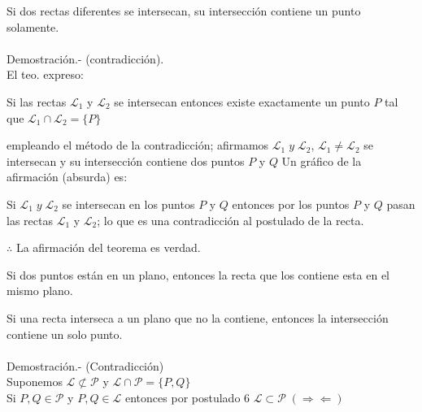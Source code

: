 \begin{teo}
Si dos rectas diferentes se intersecan, su intersección contiene un punto solamente.\\\\
Demostración.- \; (contradicción). \\
El teo. expreso: 
\begin{center}
Si las rectas $\mathscr{L}_1$ y $\mathscr{L}_2$ se intersecan entonces existe exactamente un punto $P$ tal que $\mathscr{L}_1 \cap \mathscr{L}_2 = \lbrace P \rbrace$
\end{center}
empleando el método de la contradicción; afirmamos $\mathscr{L}_1 \;  y \; \mathscr{L}_2$, $\mathscr{L}_1 \neq \mathscr{L}_2$ se intersecan y su intersección contiene dos puntos $P$ y $Q$
Un gráfico de la afirmación (absurda) es:


\begin{center}
\begin{tikzpicture}

\end{tikzpicture}
\end{center}


Si $\mathscr{L}_1 \;  y \; \mathscr{L}_2$ se intersecan en los puntos $P$ y $Q$ entonces por los puntos $P$ y $Q$ pasan las rectas $\mathscr{L}_1$ y $\mathscr{L}_2$; lo que es una contradicción al postulado de la recta.
\begin{center}
$\therefore$ La afirmación del teorema es verdad.
\end{center}
\end{teo}

\begin{tcolorbox}[colback=black!9!,colframe=white]
\begin{post} Si dos puntos están en un plano, entonces la recta que los contiene esta en el mismo plano.
\end{post}
\end{tcolorbox}

\begin{teo}
Si una recta interseca a un plano que no la contiene, entonces la intersección contiene un solo punto.\\\\
Demostración.- \; (Contradicción)\\
Suponemos $ \mathscr{L} \not\subset \mathscr{P}$ y $\mathscr{L} \cap \mathscr{P} = \lbrace P,Q \rbrace$\\
Si $P,Q \in \mathscr{P}$ \; y \; $P,Q \in \mathscr{L}$ entonces por postulado 6 $\mathscr{L} \subset \mathscr{P} \; ( \Rightarrow \Leftarrow)$ 
\begin{center}
\begin{tikzpicture}

\end{tikzpicture}
\end{center} 
\end{teo}

